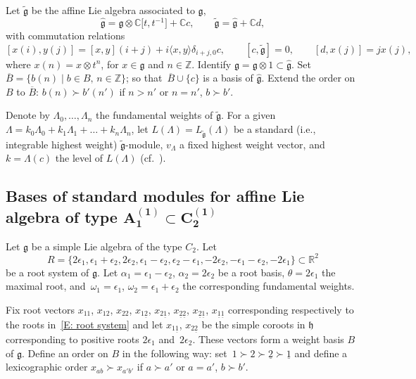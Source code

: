 \documentclass[10pt,a4paper]{amsart}
\newcommand{\g}
{{\mathfrak g}}
\newcommand{\gk}
{\hat{{\mathfrak g}}}
\newcommand{\gt}
{\tilde{{\mathfrak g}}}
\numberwithin{equation}{section}
\begin{document}
Let $\tilde{\mathfrak g}$ be the affine Lie algebra associated to $\g$,
\[
\hat{\mathfrak g} = \mathfrak{g} \otimes
\mathbb{C}\bigl[t,t^{-1}\bigr] + \mathbb{C}c, \qquad
\tilde{\mathfrak g} = \hat{\mathfrak g} + \mathbb{C} d,
\]
with commutation relations
\[
[x(i),y(j)]= [x,y](i+j)+ i\langle x,y\rangle
\delta_{i+j,0}c,\qquad [c,\gt] = 0, \qquad [d,x(j)] = j x(j),\]
where $x(n)=x\otimes t^{n}$, for $x\in{\mathfrak g}$ and $n\in\mathbb Z$. Identify $\g=\g\otimes 1\subset \gk$.
Set $\overline{B}=\{b(n) \mid b\in B,\, n \in\mathbb{Z}\}$; so that~${\overline{B}\cup \{c\}}$ is a basis of $\gk$. Extend the order on $B$ to $\overline{B}$:
$b(n)\succ b'(n')$ if $n>n'$ or $n=n'$, $ b\succ b'$.

Denote by $\Lambda_0,\dots,\Lambda_n$ the fundamental weights of $\gt$. For a given
$\Lambda=k_0 \Lambda_0+k_1 \Lambda_1+\dots+k_n \Lambda_n$, let $L(\Lambda)=L_{\gt}(\Lambda)$ be a standard (i.e., integrable highest weight) $\tilde{\mathfrak g}$-module, $v_\Lambda$ a fixed highest weight vector, and $k=\Lambda(c)$ the level of $L(\Lambda)$ (cf.\ \cite{K}).




\subsection[Bases of standard modules for affine Lie algebra of type A\_1\^(1)subset C\_2\^(1)]{Bases of standard modules for affine Lie algebra of type $\boldsymbol{ A_1^{(1)}\subset C_2^{(1)}}$}

Let $\g$ be a simple Lie algebra of the type $C_2$. Let
\begin{equation} \label{E: root system}
	R=\{2\epsilon_1, \epsilon_1 + \epsilon_2, 2\epsilon_2, \epsilon_1 - \epsilon_2, \epsilon_2 - \epsilon_1, - 2 \epsilon_2, -\epsilon_1 - \epsilon_2,-2\epsilon_1\} \subset \mathbb R^2
\end{equation}
be a root system of $\g$. Let $\alpha_1=\epsilon_1 - \epsilon_2$, $\alpha_2=2 \epsilon_2$ be a root basis, $\theta=2\epsilon_1$ the maximal root, and~${\omega_1=\epsilon_1}$, $\omega_2=\epsilon_1+\epsilon_2$ the corresponding fundamental weights.

Fix root vectors
$x_{11}$, $x_{12}$, $x_{22}$, $x_{1 \underline{2}}$, $x_{2\underline{1}}$, $x_{\underline{2}\underline{2}}$, $x_{\underline{2}\underline{1}}$, $x_{\underline{1}\underline{1}}$
corresponding respectively to the roots in~\eqref{E: root system}
and let $x_{1\underline{1}}$, $x_{2 \underline{2}}$
be the simple coroots in $\mathfrak h$ corresponding to positive roots $2\epsilon_1$ and~$2\epsilon_2$.
These vectors form a weight basis $B$ of ${\mathfrak g}$. Define an order on $B$ in the following way: set~${1\succ 2 \succ \underline{2} \succ \underline {1}}$
and define a lexicographic order
$x_{ab}\succ x_{a'b'}$ if $a\succ a'$ or $a=a'$, $b\succ b'$.
\end{document}
